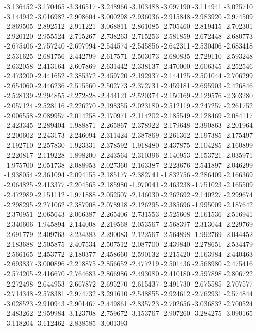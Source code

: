 -3.136452
-3.170465
-3.346517
-3.248966
-3.103488
-3.097190
-3.114941
-3.025710
-3.144942
-3.016982
-2.908604
-3.000298
-2.936036
-2.915848
-2.983920
-2.974509
-2.869505
-2.892512
-2.911221
-3.068811
-2.861085
-2.705460
-2.819415
-2.702301
-2.920120
-2.955524
-2.715267
-2.738263
-2.715253
-2.581859
-2.672448
-2.680773
-2.675406
-2.757240
-2.697994
-2.544574
-2.545856
-2.642311
-2.530406
-2.683418
-2.531625
-2.681756
-2.442799
-2.617571
-2.503073
-2.680835
-2.729110
-2.593248
-2.632058
-2.413164
-2.607869
-2.631442
-2.338137
-2.470000
-2.606345
-2.252546
-2.473200
-2.441652
-2.385372
-2.459720
-2.192937
-2.144125
-2.501044
-2.706299
-2.654060
-2.446236
-2.515560
-2.502773
-2.372731
-2.459181
-2.695903
-2.426846
-2.528139
-2.294855
-2.272828
-2.444121
-2.520374
-2.150169
-2.129576
-2.303280
-2.057124
-2.528116
-2.226270
-2.198355
-2.023180
-2.512119
-2.247257
-2.261752
-2.006558
-2.089957
-2.014258
-2.170971
-2.114202
-2.185549
-2.128469
-2.084117
-2.423345
-2.289404
-1.988871
-2.265867
-2.378922
-2.179648
-2.390863
-2.201964
-2.200602
-2.243173
-2.246094
-2.311424
-2.387869
-2.261362
-2.197385
-2.175497
-2.192710
-2.257830
-1.923331
-2.378592
-1.918480
-2.437875
-2.104285
-2.160899
-2.220817
-2.119228
-1.898200
-2.243564
-2.310396
-2.140953
-2.153721
-2.035971
-1.975700
-2.051738
-2.088953
-2.027360
-2.163387
-2.223676
-2.541897
-2.046299
-1.938054
-2.361094
-2.094155
-2.185177
-2.382741
-1.832756
-2.286409
-2.166369
-2.064825
-2.413377
-2.204565
-2.185980
-1.970041
-2.463238
-1.751023
-2.165509
-2.472989
-2.151112
-1.971888
-2.052507
-2.146030
-2.262692
-2.140227
-2.299674
-2.298295
-2.271062
-2.387908
-2.078918
-2.126295
-2.385696
-1.995009
-2.187642
-2.370951
-2.065643
-2.066387
-2.265406
-2.731553
-2.525608
-2.161536
-2.516941
-2.340606
-1.945894
-2.144008
-2.219568
-2.053567
-2.568397
-2.313044
-2.229769
-2.691779
-2.409763
-2.234383
-2.290083
-2.122567
-2.564898
-1.992769
-2.044452
-2.183688
-2.505875
-2.407534
-2.507512
-2.087700
-2.439840
-2.278651
-2.534479
-2.566165
-2.453772
-2.180377
-2.458660
-2.590132
-2.215420
-2.163984
-2.440463
-2.693837
-3.000896
-2.218875
-2.856652
-2.477219
-2.501436
-2.568980
-2.475416
-2.574205
-2.416670
-2.764683
-2.866986
-2.493080
-2.410180
-2.597898
-2.806722
-2.272498
-2.644953
-2.667872
-2.695270
-2.615437
-2.491730
-2.675585
-2.707577
-2.714348
-2.578381
-2.974732
-3.291610
-2.548855
-2.924612
-2.762931
-2.574844
-3.028523
-2.910943
-2.901467
-2.449861
-2.835723
-2.702656
-3.036832
-2.700524
-2.483262
-2.959984
-3.123708
-2.759672
-3.153767
-2.907260
-3.284275
-3.090165
-3.118204
-3.112462
-2.838585
-3.001393
